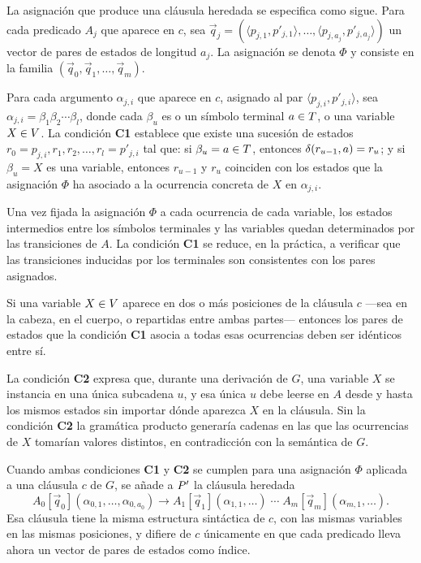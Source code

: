 La asignación que produce una cláusula heredada se especifica como sigue. Para cada predicado $A_j$ que aparece en $c$, sea $\vec{q}_j = (\langle p_{j,1}, p'_{j,1} \rangle, \dots, \langle p_{j, a_j}, p'_{j, a_j} \rangle)$ un vector de pares de estados de longitud $a_j$. La asignación se denota $\Phi$ y consiste en la familia $(\vec{q}_0, \vec{q}_1, \dots, \vec{q}_m)$.

\begin{condicion}
\label{cond:c1}
Para cada argumento $\alpha_{j,i}$ que aparece en $c$, asignado al par $\langle p_{j,i}, p'_{j,i} \rangle$, sea $\alpha_{j,i} = \beta_1 \beta_2 \cdots \beta_l$, donde cada $\beta_u$ es o un símbolo terminal $a \in T$, o una variable $X \in V$. La condición \textbf{C1} establece que existe una sucesión de estados $r_0 = p_{j,i}, r_1, r_2, \dots, r_l = p'_{j,i}$ tal que: si $\beta_u = a \in T$, entonces $\delta(r_{u-1}, a) = r_u$; y si $\beta_u = X$ es una variable, entonces $r_{u-1}$ y $r_u$ coinciden con los estados que la asignación $\Phi$ ha asociado a la ocurrencia concreta de $X$ en $\alpha_{j,i}$.
\end{condicion}

Una vez fijada la asignación $\Phi$ a cada ocurrencia de cada variable, los estados intermedios entre los símbolos terminales y las variables quedan determinados por las transiciones de $A$. La condición \textbf{C1} se reduce, en la práctica, a verificar que las transiciones inducidas por los terminales son consistentes con los pares asignados.

\begin{condicion}
\label{cond:c2}
Si una variable $X \in V$ aparece en dos o más posiciones de la cláusula $c$ ---sea en la cabeza, en el cuerpo, o repartidas entre ambas partes--- entonces los pares de estados que la condición \textbf{C1} asocia a todas esas ocurrencias deben ser idénticos entre sí.
\end{condicion}

La condición \textbf{C2} expresa que, durante una derivación de $G$, una variable $X$ se instancia en una única subcadena $u$, y esa única $u$ debe leerse en $A$ desde y hasta los mismos estados sin importar dónde aparezca $X$ en la cláusula. Sin la condición \textbf{C2} la gramática producto generaría cadenas en las que las ocurrencias de $X$ tomarían valores distintos, en contradicción con la semántica de $G$.

Cuando ambas condiciones \textbf{C1} y \textbf{C2} se cumplen para una asignación $\Phi$ aplicada a una cláusula $c$ de $G$, se añade a $P'$ la cláusula heredada
\[
A_0[\vec{q}_0](\alpha_{0,1}, \dots, \alpha_{0, a_0}) \to A_1[\vec{q}_1](\alpha_{1,1}, \dots) \; \cdots \; A_m[\vec{q}_m](\alpha_{m,1}, \dots).
\]
Esa cláusula tiene la misma estructura sintáctica de $c$, con las mismas variables en las mismas posiciones, y difiere de $c$ únicamente en que cada predicado lleva ahora un vector de pares de estados como índice.

